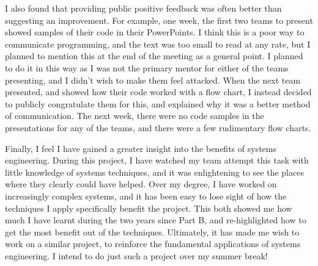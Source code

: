         I also found that providing public positive feedback was often better than suggesting an improvement.
        For example, one week, the first two teams to present showed samples of their code in their PowerPoints.
        I think this is a poor way to communicate programming, and the text was too small to read at any rate, but I planned to mention this at the end of the meeting as a general point.
        I planned to do it in this way as I was not the primary mentor for either of the teams presenting, and I didn't wish to make them feel attacked.
        When the next team presented, and showed how their code worked with a flow chart, I instead decided to publicly congratulate them for this, and explained why it was a better method of communication.
        The next week, there were no code samples in the presentations for any of the teams, and there were a few rudimentary flow charts.

        Finally, I feel I have gained a greater insight into the benefits of systems engineering.
        During this project, I have watched my team attempt this task with little knowledge of systems techniques, and it was enlightening to see the places where they clearly could have helped.
        Over my degree, I have worked on increasingly complex systems, and it has been easy to lose sight of how the techniques I apply specifically benefit the project.
        This both showed me how much I have learnt during the two years since Part B, and re-highlighted how to get the most benefit out of the techniques.
        Ultimately, it has made me wish to work on a similar project, to reinforce the fundamental applications of systems engineering.
        I intend to do just such a project over my summer break!

